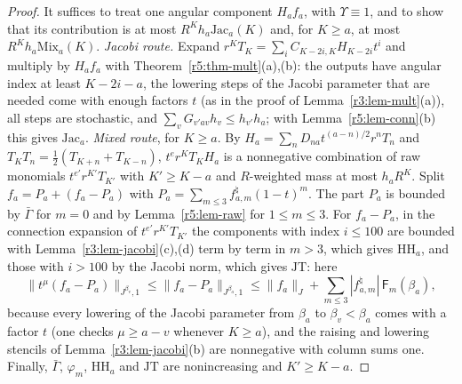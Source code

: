 \documentclass[11pt]{amsart}
\theoremstyle{definition}
\theoremstyle{remark}
\numberwithin{equation}{section}
\newcommand{\nrm}[1]{\lVert #1\rVert}
\begin{document}
\begin{proof}
It suffices to treat one angular component $H_af_a$, with $\Upsilon\equiv1$, and to show that its contribution is at most $R^Kh_a\mathrm{Jac}_a(K)$ and, for $K\geq a$, at most $R^Kh_a\mathrm{Mix}_a(K)$. \emph{Jacobi route.} Expand $r^KT_K=\sum_iC_{K-2i,K}H_{K-2i}t^i$ and multiply by $H_af_a$ with Theorem~\ref{r5:thm-mult}(a),(b): the outputs have angular index at least $K-2i-a$, the lowering steps of the Jacobi parameter that are needed come with enough factors $t$ (as in the proof of Lemma~\ref{r3:lem-mult}(a)), all steps are stochastic, and $\sum_vG_{v'av}h_v\leq h_{v'}h_a$; with Lemma~\ref{r5:lem-conn}(b) this gives $\mathrm{Jac}_a$. \emph{Mixed route}, for $K\geq a$. By $H_a=\sum_nD_{na}t^{(a-n)/2}r^nT_n$ and $T_KT_n=\frac12(T_{K+n}+T_{K-n})$, $t^er^KT_KH_a$ is a nonnegative combination of raw monomials $t^{e'}r^{K'}T_{K'}$ with $K'\geq K-a$ and $R$-weighted mass at most $h_aR^K$. Split $f_a=P_a+(f_a-P_a)$ with $P_a=\sum_{m\leq3}f^\natural_{a,m}(1-t)^m$. The part $P_a$ is bounded by $\bar\Gamma$ for $m=0$ and by Lemma~\ref{r5:lem-raw} for $1\leq m\leq3$. For $f_a-P_a$, in the connection expansion of $t^{e'}r^{K'}T_{K'}$ the components with index $i\leq100$ are bounded with Lemma~\ref{r3:lem-jacobi}(c),(d) term by term in $m>3$, which gives $\mathrm{HH}_a$, and those with $i>100$ by the Jacobi norm, which gives $\mathrm{JT}$: here
\[
\nrm{t^\mu(f_a-P_a)}_{J^{\beta_v},1}\leq\nrm{f_a-P_a}_{J^{\beta_a},1}\leq\nrm{f_a}_J+\sum_{m\leq3}|f^\natural_{a,m}|\,\mathsf F_m(\beta_a),
\]
because every lowering of the Jacobi parameter from $\beta_a$ to $\beta_v<\beta_a$ comes with a factor $t$ (one checks $\mu\geq a-v$ whenever $K\geq a$), and the raising and lowering stencils of Lemma~\ref{r3:lem-jacobi}(b) are nonnegative with column sums one. Finally, $\bar\Gamma$, $\varphi_m$, $\mathrm{HH}_a$ and $\mathrm{JT}$ are nonincreasing and $K'\geq K-a$.
\end{proof}
\end{document}
